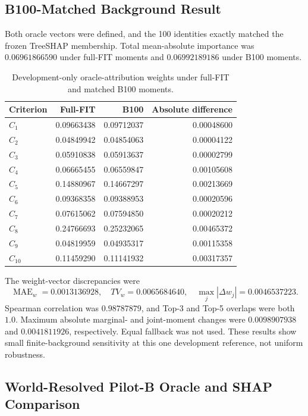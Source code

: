 \documentclass[runningheads]{llncs}
\begin{document}
\subsection{B100-Matched Background Result}

Both oracle vectors were defined, and the 100 identities exactly matched the frozen TreeSHAP
membership. Total mean-absolute importance was $0.06961866590$ under full-FIT moments and
$0.06992189186$ under B100 moments.

\begin{table}[t]
\centering
\caption{Development-only oracle-attribution weights under full-FIT and matched B100 moments.}
\label{supp:tab:b100weights}
\small
\begin{tabular}{@{}lrrr@{}}
\toprule
Criterion & Full-FIT & B100 & Absolute difference\\
\midrule
$C_1$  & 0.09663438 & 0.09712037 & 0.00048600\\
$C_2$  & 0.04849942 & 0.04854063 & 0.00004122\\
$C_3$  & 0.05910838 & 0.05913637 & 0.00002799\\
$C_4$  & 0.06665455 & 0.06559847 & 0.00105608\\
$C_5$  & 0.14880967 & 0.14667297 & 0.00213669\\
$C_6$  & 0.09368358 & 0.09388953 & 0.00020596\\
$C_7$  & 0.07615062 & 0.07594850 & 0.00020212\\
$C_8$  & 0.24766693 & 0.25232065 & 0.00465372\\
$C_9$  & 0.04819959 & 0.04935317 & 0.00115358\\
$C_{10}$ & 0.11459290 & 0.11141932 & 0.00317357\\
\bottomrule
\end{tabular}
\end{table}

The weight-vector discrepancies were
\begin{equation}
\operatorname{MAE}_w=0.0013136928,\quad
TV_w=0.0065684640,\quad
\max_j|\Delta w_j|=0.0046537223.
\label{supp:eq:b100distances}
\end{equation}
Spearman correlation was $0.98787879$, and Top-3 and Top-5 overlaps were both $1.0$.
Maximum absolute marginal- and joint-moment changes were $0.0098907938$ and $0.0041811926$,
respectively. Equal fallback was not used. These results show small
finite-background sensitivity at this one development reference, not uniform robustness.

\subsection{World-Resolved Pilot-B Oracle and SHAP Comparison}
\end{document}
